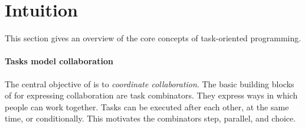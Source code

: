 


\section{Intuition}
\label{sec:intuition}

This section gives an overview of the core concepts of task-oriented programming.



\paragraph{Tasks model collaboration}

The central objective of \TOP is to \emph{coordinate collaboration}.
The basic building blocks of \TOPHAT for expressing collaboration are task combinators.
They express ways in which people can work together.
Tasks can be executed after each other, at the same time, or conditionally.
This motivates the combinators step, parallel, and choice.

